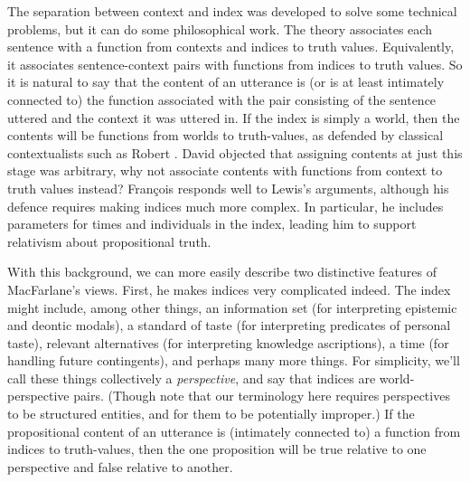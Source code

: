The separation between context and index was developed to solve some technical problems, but it can do some philosophical work. The theory associates each sentence with a function from contexts and indices to truth values. Equivalently, it associates sentence-context pairs with functions from indices to truth values. So it is natural to say that the content of an utterance is (or is at least intimately connected to) the function associated with the pair consisting of the sentence uttered and the context it was uttered in. If the index is simply a world, then the contents will be functions from worlds to truth-values, as defended by classical contextualists such as Robert  \citet{Stalnaker1984}. David  \citet{Lewis1980b} objected that assigning contents at just this stage was arbitrary, why not associate contents with functions from context to truth values instead? François  \citet{Recanati2007} responds well to Lewis's arguments, although his defence requires making indices much more complex. In particular, he includes parameters for times and individuals in the index, leading him to support relativism about propositional truth.

With this background, we can more easily describe two distinctive features of MacFarlane's views. First, he makes indices very complicated indeed. The index might include, among other things, an information set (for interpreting epistemic and deontic modals), a standard of taste (for interpreting predicates of personal taste), relevant alternatives (for interpreting knowledge ascriptions), a time (for handling future contingents), and perhaps many more things. For simplicity, we'll call these things collectively a \emph{perspective}, and say that indices are world-perspective pairs. (Though note that our terminology here requires perspectives to be structured entities, and for them to be potentially improper.) If the propositional content of an utterance is (intimately connected to) a function from indices to truth-values, then the one proposition will be true relative to one perspective and false relative to another.

